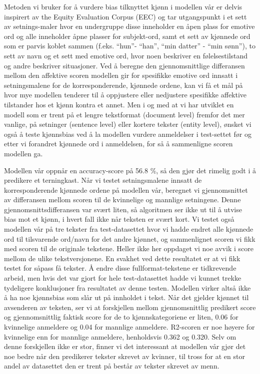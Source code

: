 \documentclass[11pt, a4paper]{article}
\begin{document}
Metoden vi bruker for å vurdere bias tilknyttet kjønn i modellen vår er delvis inspirert av the Equity Evaluation Corpus (EEC) \cite{DBLP:journals/corr/abs-1805-04508} og tar utgangspunkt i et sett av setnings-maler hvor en undergruppe disse inneholder en åpen plass for emotive ord og alle inneholder åpne plasser for subjekt-ord, samt et sett av kjønnede ord som er parvis koblet sammen (f.eks. “hun”- “han”, “min datter” - “min sønn”), to sett av navn og et sett med emotive ord, hvor noen beskriver en følelsestilstand og andre beskriver situasjoner. Ved  å beregne den gjennomsnittlige differansen mellom den affektive scoren modellen gir for spesifikke emotive ord innsatt i setningsmalene for de korresponderende, kjønnede ordene, kan vi få et mål på hvor mye modellen tenderer til å oppjustere eller nedjustere spesifikke affektive tilstander hos et kjønn kontra et annet. Men i og med at vi har utviklet en modell som er trent på et lengre tekstformat (document level) fremfor det mer vanlige, på setninger (sentence level) eller kortere tekster (entity level), ønsket vi også å teste kjønnsbias ved å la modellen vurdere anmeldelser i test-settet før og etter vi forandret kjønnede ord i anmeldelsen, for så å sammenligne scoren modellen ga.

Modellen vår oppnår en accuracy-score på 56.8 \%, så den gjør det rimelig godt i å predikere et terningkast. Når vi testet setningsmalene innsatt de korresponderende kjønnede ordene på modellen vår, beregnet vi gjennomsnittet av differansen mellom scoren til de kvinnelige og mannlige setningene. Denne gjennomsnittsdifferansen var svært liten, så algoritmen ser ikke ut til å utvise bias mot et kjønn, i hvert fall ikke når teksten er svært kort. Vi testet også modellen vår på tre tekster fra test-datasettet hvor vi hadde endret alle kjønnede ord til tilsvarende ord/navn for det andre kjønnet, og sammenlignet scoren vi fikk med scoren til de originale tekstene. Heller ikke her oppdaget vi noe avvik i score mellom de ulike tekstversjonene. En svakhet ved dette resultatet er at vi fikk testet for såpass få tekster. Å endre disse fullformat-tekstene er tidkrevende arbeid, men hvis det var gjort for hele test-datasettet hadde vi kunnet trekke tydeligere konklusjoner fra resultatet av denne testen. Modellen virker altså ikke å ha noe kjønnsbias som slår ut på innholdet i tekst. Når det gjelder kjønnet til avsenderen av teksten, ser vi at forskjellen mellom gjennomsnittlig predikert score og gjennomsnittlig faktisk score for de to kjønnskategoriene er liten, 0.06 for kvinnelige anmeldere og 0.04 for mannlige anmeldere. R2-scoren er noe høyere for kvinnelige enn for mannlige anmeldere, henholdsvis 0.362 og 0.320. Selv om denne forskjellen ikke er stor, finner vi det interessant at modellen vår gjør det noe bedre når den predikerer tekster skrevet av kvinner, til tross for at en stor andel av datasettet den er trent på består av tekster skrevet av menn. 
\end{document}
